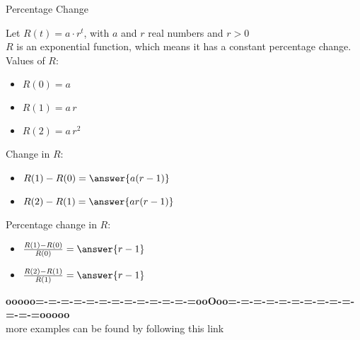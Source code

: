 \documentclass{ximera}
\begin{document}
\begin{example} Percentage Change



Let $R(t) = a \cdot r^t$, with $a$ and $r$ real numbers and $r>0$ \\

$R$ is an exponential function, which means it has a constant percentage change. \\

Values of $R$:

\begin{itemize}
\item $R(0) = a$

\item $R(1) = a \, r$

\item $R(2) = a \, r^2$
\end{itemize}



Change in $R$:

\begin{itemize}
\item $R(1) - R(0) = \answer{a (r-1)}$

\item $R(2) - R(1) = \answer{a r (r-1)}$

\end{itemize}





Percentage change in $R$:

\begin{itemize}
\item $\frac{R(1) - R(0)}{R(0)} = \answer{r-1}$

\item $\frac{R(2) - R(1)}{R(1)} = \answer{r-1}$

\end{itemize}


\end{example}













\begin{center}
\textbf{\textcolor{green!50!black}{ooooo=-=-=-=-=-=-=-=-=-=-=-=-=ooOoo=-=-=-=-=-=-=-=-=-=-=-=-=ooooo}} \\

more examples can be found by following this link\\ 

\end{center}
\end{document}
